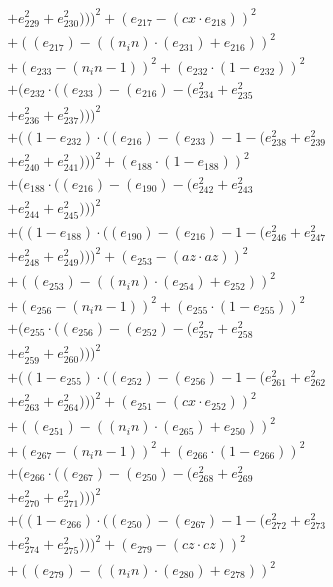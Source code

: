 \documentclass[10pt, a4paper]{article}
\begin{document}
\begin{align*}
& + e_{229}^{2} + e_{230}^{2})))^{2} + (e_{217} - (cx  \cdot  e_{218}))^{2} \\
& + ((e_{217}) - ((n_in)  \cdot  (e_{231}) + e_{216}))^{2} \\
& + (e_{233} - (n_in - 1))^{2} + (e_{232}  \cdot  (1 - e_{232}))^{2} \\
& + (e_{232}  \cdot  ((e_{233}) - (e_{216}) - (e_{234}^{2} + e_{235}^{2} \\
& + e_{236}^{2} + e_{237}^{2})))^{2} \\
& + ((1 - e_{232})  \cdot  ((e_{216}) - (e_{233}) - 1 - (e_{238}^{2} + e_{239}^{2} \\
& + e_{240}^{2} + e_{241}^{2})))^{2} + (e_{188}  \cdot  (1 - e_{188}))^{2} \\
& + (e_{188}  \cdot  ((e_{216}) - (e_{190}) - (e_{242}^{2} + e_{243}^{2} \\
& + e_{244}^{2} + e_{245}^{2})))^{2} \\
& + ((1 - e_{188})  \cdot  ((e_{190}) - (e_{216}) - 1 - (e_{246}^{2} + e_{247}^{2} \\
& + e_{248}^{2} + e_{249}^{2})))^{2} + (e_{253} - (az  \cdot  az))^{2} \\
& + ((e_{253}) - ((n_in)  \cdot  (e_{254}) + e_{252}))^{2} \\
& + (e_{256} - (n_in - 1))^{2} + (e_{255}  \cdot  (1 - e_{255}))^{2} \\
& + (e_{255}  \cdot  ((e_{256}) - (e_{252}) - (e_{257}^{2} + e_{258}^{2} \\
& + e_{259}^{2} + e_{260}^{2})))^{2} \\
& + ((1 - e_{255})  \cdot  ((e_{252}) - (e_{256}) - 1 - (e_{261}^{2} + e_{262}^{2} \\
& + e_{263}^{2} + e_{264}^{2})))^{2} + (e_{251} - (cx  \cdot  e_{252}))^{2} \\
& + ((e_{251}) - ((n_in)  \cdot  (e_{265}) + e_{250}))^{2} \\
& + (e_{267} - (n_in - 1))^{2} + (e_{266}  \cdot  (1 - e_{266}))^{2} \\
& + (e_{266}  \cdot  ((e_{267}) - (e_{250}) - (e_{268}^{2} + e_{269}^{2} \\
& + e_{270}^{2} + e_{271}^{2})))^{2} \\
& + ((1 - e_{266})  \cdot  ((e_{250}) - (e_{267}) - 1 - (e_{272}^{2} + e_{273}^{2} \\
& + e_{274}^{2} + e_{275}^{2})))^{2} + (e_{279} - (cz  \cdot  cz))^{2} \\
& + ((e_{279}) - ((n_in)  \cdot  (e_{280}) + e_{278}))^{2} \\

\end{align*}
\end{document}
